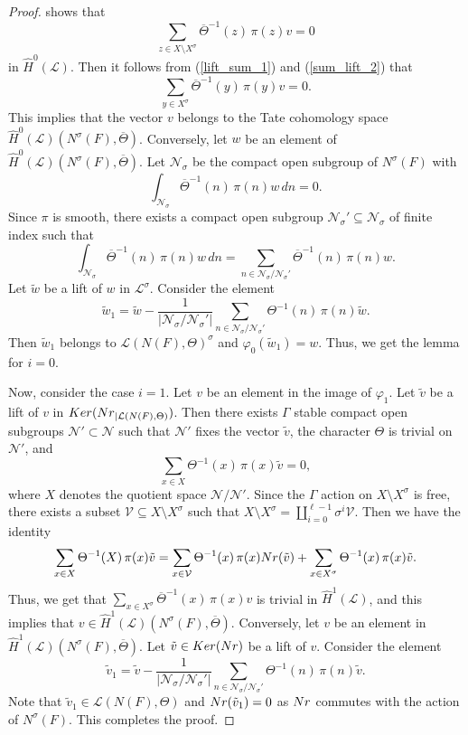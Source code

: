 \documentclass[10pt,a4paper]{amsart}
\begin{document}
\begin{proof}
shows that
$$ \sum_{z\in {X\setminus X^\sigma}} 
\overline{\Theta}^{-1}(z)\,\pi(z)v = 0 $$ 
in $\widehat{H}^0(\mathcal{L})$. Then it follows from
(\ref{lift_sum_1}) and (\ref{sum_lift_2}) that
$$ \sum_{y\in X^\sigma} 
\overline{\Theta}^{-1}(y)\,\pi(y)v = 0. $$ This implies that the vector $v$
belongs to the Tate cohomology space
$\widehat{H}^0(\mathcal{L})(N^\sigma(F),\overline{\Theta})$.
Conversely, let $w$ be an element of
$\widehat{H}^0(\mathcal{L})(N^\sigma(F),\overline{\Theta})$.  Let
$\mathcal{N}_{\sigma}$ be the compact open subgroup of $N^\sigma(F)$
with
$$ \int_{\mathcal{N}_{\sigma}}\overline{\Theta}^{-1}(n)\,
\pi(n)w\,dn = 0. $$ Since $\pi$ is smooth, there exists a compact open
subgroup $\mathcal{N}_{\sigma}'\subseteq \mathcal{N}_{\sigma}$ of
finite index such that
$$ \int_{\mathcal{N}_{\sigma}}
\overline{\Theta}^{-1}(n)\,\pi(n)w\,dn = \sum_{n\in
  \mathcal{N}_{\sigma}/\mathcal{N}_{\sigma}'}
\overline{\Theta}^{-1}(n)\,\pi(n)w. $$ Let $\tilde{w}$ be a lift of
$w$ in $\mathcal{L}^\sigma$. Consider the element
$$ \tilde{w}_1 = \tilde{w} -
\frac{1}{\lvert\mathcal{N}_{\sigma}
/\mathcal{N}_{\sigma}'\rvert} \sum_{n\in \mathcal{N}_{\sigma}/\mathcal{N}_{\sigma}'}
\Theta^{-1}(n)\,\pi(n)\tilde{w}. $$
Then $\tilde{w}_1$ belongs to $\mathcal{L}(N(F),\Theta)^\sigma$ 
and $\varphi_0(\tilde{w}_1) = w$. 
Thus, we get the lemma for
$i=0$.

Now, consider the case $i=1$. Let $v$ be an element in the image of
$\varphi_1$.  Let $\tilde{v}$ be a lift of $v$ in
${\rm Ker}({\rm Nr}_{|\mathcal{L}(N(F),\Theta)})$. Then there exists
$\Gamma$ stable compact open subgroups
$\mathcal{N}'\subset \mathcal{N}$ such that $\mathcal{N}'$ fixes the
vector $\tilde{v}$, the character $\Theta$ is trivial on $\mathcal{N}'$, and
$$ \sum_{x\in X}\Theta^{-1}(x)\,\pi(x)\tilde{v} = 0, $$ 
where $X$ denotes the quotient space $\mathcal{N}/\mathcal{N}'$. Since
the $\Gamma$ action on $X\setminus X^\sigma$ is free,
there exists a subset $\mathcal{V}\subseteq X\setminus X^\sigma$ such
that $X\setminus X^\sigma
= \coprod_{i=0}^{\ell-1}\sigma^i\mathcal{V}$.
Then we have the identity
$$ \sum_{x\in X}\Theta^{-1}(X)\,\pi(x)\tilde{v}
= \sum_{x\in\mathcal{V}}\Theta^{-1}(x)\,\pi(x){\rm Nr}(\tilde{v})+
\sum_{x\in X^\sigma}\Theta^{-1}(x)\,\pi(x)\tilde{v}. $$ Thus, we get
that $\sum_{x\in X^\sigma}\overline{\Theta}^{-1}(x)\,\pi(x)v$ is
trivial in $\widehat{H}^1(\mathcal{L})$, and this implies that
$v\in \widehat{H}^1(\mathcal{L})
(N^\sigma(F),\overline{\Theta})$. Conversely, let $v$ be an element in
$\widehat{H}^1(\mathcal{L}) (N^\sigma(F),\overline{\Theta})$. Let
$\tilde{v}\in {\rm Ker}({\rm Nr})$ be a lift of $v$. Consider the
element
$$ \tilde{v}_1=\tilde{v}-\dfrac{1}
{|\mathcal{N}_\sigma/\mathcal{N}_\sigma'|} \sum_{n\in
  \mathcal{N}_\sigma/\mathcal{N}_\sigma'}
\Theta^{-1}(n)\,\pi(n)\tilde{v}. $$ Note that
$\tilde{v}_1\in \mathcal{L}(N(F),\Theta)$ and
${\rm Nr}(\tilde{v}_1)=0$ as ${\rm Nr}$ commutes with the action of
$N^\sigma(F)$.  This completes the proof.
\end{proof}
\end{document}
